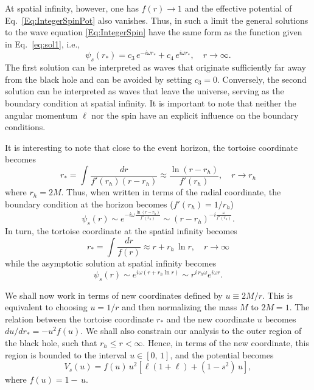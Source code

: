 At spatial infinity, however, one has $f(r)\to 1$ and the effective potential of Eq.~\eqref{Eq:IntegerSpinPot} also vanishes. Thus, in such a limit the general solutions to the wave equation \eqref{Eq:IntegerSpin} have the same form as the function given in Eq.~\ref{eq:sol1}, i.e.,
%
\begin{equation}
  \psi_{s}(r_*)=c_3\, e^{-i\omega r_*}+c_4\, e^{i\omega r_*}, \quad r\to \infty.
\end{equation}
%
The first solution can be interpreted as waves that originate sufficiently far away from the black hole and can be avoided by setting $c_3=0$. Conversely, the second solution can be interpreted as waves that leave the universe, serving as the boundary condition at spatial infinity. It is important to note that neither the angular momentum $\ell$ nor the spin have an explicit influence on the boundary conditions.

It is interesting to note that close to the event horizon, the tortoise coordinate becomes
%
\begin{equation}
  r_*=\int \frac{dr}{f'(r_h)(r-r_h)}\approx \frac{\ln{(r-r_h)}}{ f'(r_h)},\quad r\to r_h
\end{equation}
where $r_h=2M$.
Thus, when written in terms of the radial coordinate, the boundary condition at the horizon becomes ($f'(r_h)=1/r_h$)
%
\begin{equation}
  \psi_s(r)\sim e^{-i\omega \frac{\ln{(r-r_h)}}{f'(r_h)}}\sim \left(r-r_h\right)^{-i\frac{\omega}{f'(r_h)}}.
\end{equation}
%
In turn, the tortoise coordinate at the spatial infinity becomes
%
\begin{equation}
  r_*=\int \frac{dr}{f(r)}\approx r+r_h\,\ln{r},\quad r\to \infty
\end{equation}
%
while the asymptotic solution at spatial infinity becomes
%
\begin{equation}
  \psi_s(r)\sim e^{i\omega(r+ r_h \ln{r})}\sim r^{i\, r_h\omega}e^{i\omega r}.
\end{equation}

We shall now work in terms of new coordinates defined by $u\equiv2M/r$. This is equivalent to choosing $u=1/r$ and then normalizing the mass $M$ to $2M=1$. The relation between the tortoise coordinate $r_*$ and the new coordinate $u$  becomes $du/dr_*=-u^2f(u)$. We shall also constrain our analysis to the outer region of the black hole, such that $r_h\leq r<\infty$. Hence, in terms of the new coordinate, this region is bounded to the interval $u\in [0,\, 1]$, and the potential becomes
%
\begin{equation}
  V_{s}(u)=f(u)\,u^2\left[\ell\left(1+\ell\right)+\left(1-s^2\right)\,u\right],
\end{equation}
%
where $f(u) = 1- \,u$.

